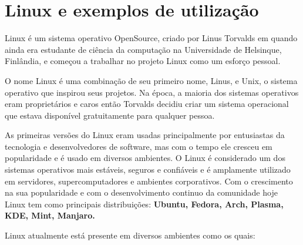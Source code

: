 ﻿\section{Linux e exemplos de utilização} \label{section: linux e exemplos}

Linux é um sistema operativo OpenSource, criado por Linus Torvalds em quando ainda era estudante de ciência da computação na Universidade de Helsinque, Finlândia, e começou a trabalhar no projeto Linux como
um esforço pessoal.

O nome Linux é uma combinação de seu primeiro nome, Linus, e Unix, o sistema operativo que inspirou seus projetos. Na época, a maioria dos sistemas operativos eram proprietários e caros então Torvalds
decidiu criar um sistema operacional que estava disponível gratuitamente para qualquer pessoa.

As primeiras versões do Linux eram usadas principalmente por entusiastas da tecnologia e desenvolvedores de software, mas com o tempo ele cresceu em popularidade e é usado em diversos ambientes. O Linux é 
considerado um dos sistemas operativos mais estáveis, seguros e confiáveis e é amplamente utilizado em servidores, supercomputadores e ambientes corporativos. 
Com o crescimento na sua popularidade e com o desenvolvimento continuo da comunidade hoje Linux tem como principais distribuições: \textbf{Ubuntu, Fedora, Arch, Plasma, KDE, Mint, Manjaro.}

Linux atualmente está presente em diversos ambientes como os quais:

